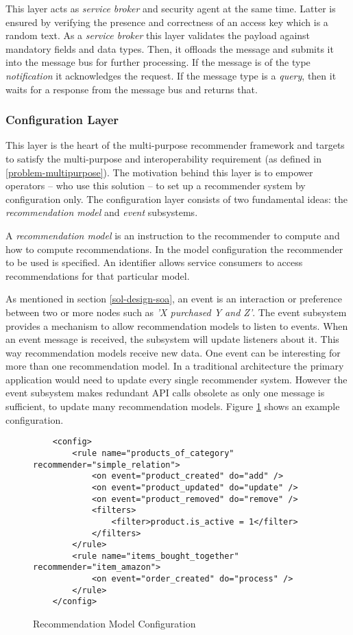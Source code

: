 This layer acts as \emph{service broker} and security agent at the same time. Latter is ensured by verifying the presence and correctness of an access key which is a random text. As a \emph{service broker} this layer validates the payload against mandatory fields and data types. Then, it offloads the message and submits it into the message bus for further processing. If the message is of the type \emph{notification} it acknowledges the request. If the message type is a \emph{query}, then it waits for a response from the message bus and returns that.

\subsubsection{Configuration Layer}
\label{sol-design-layer-config}

This layer is the heart of the multi-purpose recommender framework and targets to satisfy the multi-purpose and interoperability requirement (as defined in \ref{problem-multipurpose}). The motivation behind this layer is to empower operators -- who use this solution -- to set up a recommender system by configuration only. The configuration layer consists of two fundamental ideas: the \emph{recommendation model} and \emph{event} subsystems.

A \emph{recommendation model} is an instruction to the recommender to compute and how to compute recommendations. In the model configuration the recommender to be used is specified. An identifier allows service consumers to access recommendations for that particular model.

As mentioned in section \ref{sol-design-soa}, an event is an interaction or preference between two or more nodes such as \emph{'X purchased Y and Z'}. The event subsystem provides a mechanism to allow recommendation models to listen to events. When an event message is received, the subsystem will update listeners about it. This way recommendation models receive new data. One event can be interesting for more than one recommendation model. In a traditional architecture the primary application would need to update every single recommender system. However the event subsystem makes redundant API calls obsolete as only one message is sufficient, to update many recommendation models. Figure \ref{fig:recomodel-config} shows an example configuration.

\begin{figure}[ht]
    \tiny
    \lstset{language=XML}
    \begin{lstlisting}
    <config>
        <rule name="products_of_category" recommender="simple_relation">
            <on event="product_created" do="add" />
            <on event="product_updated" do="update" />
            <on event="product_removed" do="remove" />
            <filters>
                <filter>product.is_active = 1</filter>
            </filters>
        </rule>
        <rule name="items_bought_together" recommender="item_amazon">
            <on event="order_created" do="process" />
        </rule>
    </config>
    \end{lstlisting}
    \caption{Recommendation Model Configuration}
    \label{fig:recomodel-config}
\end{figure}

